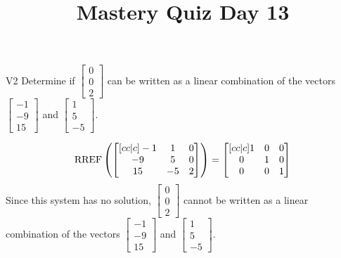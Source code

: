 \documentclass{sbgLAquiz}
\title{Mastery Quiz Day 13 }
\begin{document}
\begin{problem}{V2}
Determine if  $\begin{bmatrix} 0 \\ 0 \\ 2 \end{bmatrix}$ can be written as a linear combination of the vectors $\begin{bmatrix} -1 \\ -9 \\ 15 \end{bmatrix}$ and $\begin{bmatrix} 1 \\ 5 \\ -5 \end{bmatrix}$.
\end{problem}
\begin{solution}
$$\operatorname{RREF}\left(\begin{bmatrix}[cc|c] -1 & 1 & 0 \\ -9 & 5 & 0 \\ 15 & -5 & 2 \end{bmatrix} \right) = \begin{bmatrix}[cc|c] 1 & 0 & 0 \\ 0 & 1 & 0 \\ 0 & 0 & 1 \end{bmatrix}$$
Since this system has no solution, $\begin{bmatrix} 0 \\ 0 \\ 2 \end{bmatrix}$ cannot be written as a linear combination of the vectors $\begin{bmatrix} -1 \\ -9 \\ 15 \end{bmatrix}$ and $\begin{bmatrix} 1 \\ 5 \\ -5 \end{bmatrix}$.

\end{solution}
\end{document}
